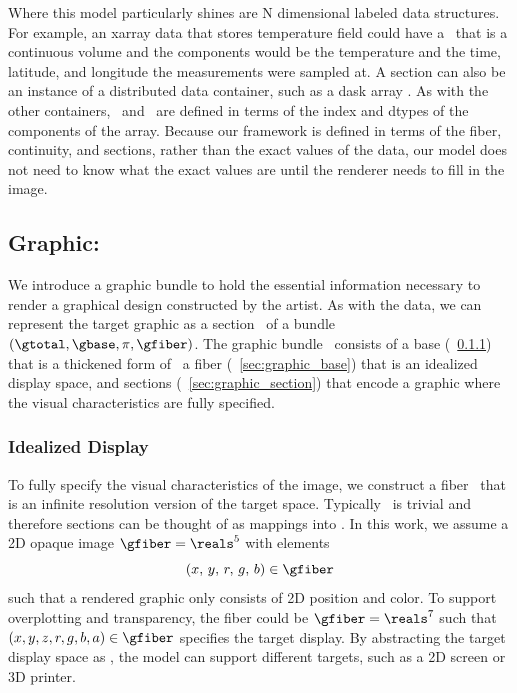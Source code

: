 \documentclass[../main.tex]{subfiles}
\begin{document}
Where this model particularly shines are N dimensional labeled data structures. For example, an xarray\cite{hoyer2017xarray} data that stores temperature field could have a \dbase\ that is a continuous volume and the components would be the temperature and the time, latitude, and longitude the measurements were sampled at. A section can also be an instance of a distributed data container, such as a dask array \cite{rocklinDaskParallelComputation2015}. As with the other containers, \dbase\ and \dfiber\ are defined in terms of the index and dtypes of the components of the array. Because our framework is defined in terms of the fiber, continuity, and sections, rather than the exact values of the data, our model does not need to know what the exact values are until the renderer needs to fill in the image.  


\subsection{Graphic: \gtotal}
\label{sec:graphic}  
We introduce a graphic bundle to hold the essential information necessary to render a graphical design constructed by the artist. As with the data, we can represent the target graphic as a section \gsection\ of a bundle  $(\gtotal, \gbase, \pi, \gfiber)$. The graphic bundle \gtotal\ consists of a base \gbase (~\ref{sec:graphic_fiber}) that is a thickened form of \dbase\, 
a fiber \gfiber (~\ref{sec:graphic_base}) that is an idealized display space, and sections \gsection (~\ref{sec:graphic_section}) that encode a graphic where the visual characteristics are fully specified.

\subsubsection{Idealized Display \gfiber}
\label{sec:graphic_fiber}
To fully specify the visual characteristics of the image, we construct a fiber \gfiber\ that is an infinite resolution version of the target space. Typically \gtotal\ is trivial and therefore sections can be thought of as mappings into \gfiber. In this work, we assume a 2D opaque image $\gfiber=\reals^5$ with elements 
\begin{equation}
(x,\, y,\, r,\, g,\, b) \in \gfiber
\end{equation}
such that a rendered graphic only consists of 2D position and color. To support overplotting and transparency, the fiber could be $\gfiber=\reals^{7}$ such that $(x, y, z, r, g, b, a) \in \gfiber$ specifies the target display. By abstracting the target display space as \gfiber, the model can support different targets, such as a 2D screen or 3D printer. 
\end{document}
